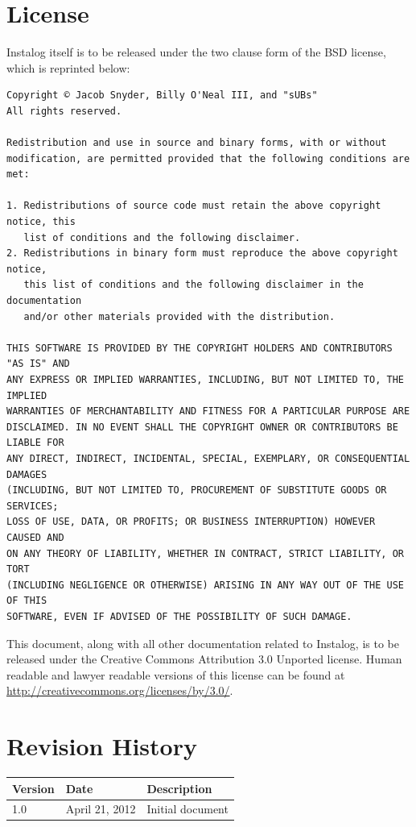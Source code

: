\documentclass[letterpaper,12pt]{article}
\begin{document}
\newpage



\appendix
\section{License} \label{license}
Instalog itself is to be released under the two clause form of the BSD license,
which is reprinted below:

\begin{verbatim}
Copyright © Jacob Snyder, Billy O'Neal III, and "sUBs"
All rights reserved.

Redistribution and use in source and binary forms, with or without
modification, are permitted provided that the following conditions are met: 

1. Redistributions of source code must retain the above copyright notice, this
   list of conditions and the following disclaimer. 
2. Redistributions in binary form must reproduce the above copyright notice,
   this list of conditions and the following disclaimer in the documentation
   and/or other materials provided with the distribution. 

THIS SOFTWARE IS PROVIDED BY THE COPYRIGHT HOLDERS AND CONTRIBUTORS "AS IS" AND
ANY EXPRESS OR IMPLIED WARRANTIES, INCLUDING, BUT NOT LIMITED TO, THE IMPLIED
WARRANTIES OF MERCHANTABILITY AND FITNESS FOR A PARTICULAR PURPOSE ARE
DISCLAIMED. IN NO EVENT SHALL THE COPYRIGHT OWNER OR CONTRIBUTORS BE LIABLE FOR
ANY DIRECT, INDIRECT, INCIDENTAL, SPECIAL, EXEMPLARY, OR CONSEQUENTIAL DAMAGES
(INCLUDING, BUT NOT LIMITED TO, PROCUREMENT OF SUBSTITUTE GOODS OR SERVICES;
LOSS OF USE, DATA, OR PROFITS; OR BUSINESS INTERRUPTION) HOWEVER CAUSED AND
ON ANY THEORY OF LIABILITY, WHETHER IN CONTRACT, STRICT LIABILITY, OR TORT
(INCLUDING NEGLIGENCE OR OTHERWISE) ARISING IN ANY WAY OUT OF THE USE OF THIS
SOFTWARE, EVEN IF ADVISED OF THE POSSIBILITY OF SUCH DAMAGE.
\end{verbatim}

This document, along with all other documentation related to Instalog,  is to be
released under the Creative Commons Attribution 3.0 Unported license. Human
readable and lawyer readable versions of this license can be found at
\url{http://creativecommons.org/licenses/by/3.0/}.

\newpage

\section{Revision History} \label{revision_history}
\begin{tabular}{| l | l | l |}
\hline
\textbf{Version} & \textbf{Date} & \textbf{Description} \\
\hline
1.0 & April 21, 2012 & Initial document \\
\hline
\end{tabular}
\end{document}
